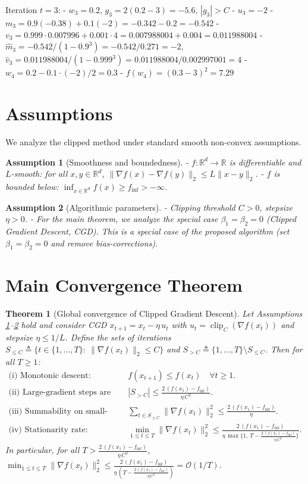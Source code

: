 \documentclass[11pt]{article}
\newtheorem{theorem}{Theorem}
\newtheorem{assumption}{Assumption}
\newcommand{\R}{\mathbb{R}}
\begin{document}
Iteration $t=3$:
- $w_3=0.2$, $g_3 = 2(0.2-3)=-5.6$, $|g_3|>C$
- $u_3=-2$
- $m_3=0.9(-0.38)+0.1(-2)=-0.342-0.2=-0.542$
- $v_3=0.999\cdot 0.007996+0.001\cdot 4=0.007988004+0.004=0.011988004$
- $\hat{m}_3=-0.542/(1-0.9^3)=-0.542/0.271=-2$, $\hat{v}_3=0.011988004/(1-0.999^3)=0.011988004/0.002997001=4$
- $w_4 = 0.2 - 0.1\cdot (-2)/2 = 0.3$
- $f(w_4)=(0.3-3)^2=7.29$

\section*{Assumptions}
We analyze the clipped method under standard smooth non-convex assumptions.

\begin{assumption}[Smoothness and boundedness]
\label{ass:smooth}
- $f:\R^d\to\R$ is differentiable and $L$-smooth: for all $x,y\in\R^d$,
$\|\nabla f(x)-\nabla f(y)\|_2 \le L \|x-y\|_2$.
- $f$ is bounded below: $\inf_{x\in\R^d} f(x) \ge f_\inf > -\infty$.
\end{assumption}

\begin{assumption}[Algorithmic parameters]
\label{ass:params}
- Clipping threshold $C>0$, stepsize $\eta>0$.
- For the main theorem, we analyze the special case $\beta_1=\beta_2=0$ (Clipped Gradient Descent, CGD). This is a special case of the proposed algorithm (set $\beta_1=\beta_2=0$ and remove bias-corrections).
\end{assumption}

\section*{Main Convergence Theorem}
\begin{theorem}[Global convergence of Clipped Gradient Descent]
\label{thm:main}
Let Assumptions \ref{ass:smooth}--\ref{ass:params} hold and consider CGD
$x_{t+1} = x_t - \eta \, u_t$ with $u_t=\operatorname{clip}_C(\nabla f(x_t))$ and stepsize $\eta \le 1/L$.
Define the sets of iterations
$S_{\le C} \triangleq \{t\in\{1,\dots,T\}:\ \|\nabla f(x_t)\|_2 \le C\}$ and $S_{>C} \triangleq \{1,\dots,T\}\setminus S_{\le C}$.
Then for all $T\ge 1$:
\begin{align}
\text{(i) Monotonic descent: } \quad & f(x_{t+1}) \le f(x_t) \quad \forall t\ge 1. \label{eq:thm-descent}\\
\text{(ii) Large-gradient steps are finite: } \quad & |S_{>C}| \le \frac{2\,(f(x_1)-f_\inf)}{\eta\, C^2}. \label{eq:thm-large}\\
\text{(iii) Summability on small-gradient steps: } \quad &
\sum_{t\in S_{\le C}} \|\nabla f(x_t)\|_2^2 \le \frac{2\,(f(x_1)-f_\inf)}{\eta}. \label{eq:thm-small-sum}\\
\text{(iv) Stationarity rate: } \quad &
\min_{1\le t\le T} \|\nabla f(x_t)\|_2^2 \le \frac{2\,(f(x_1)-f_\inf)}{\eta\,\max\{1,\ T - \frac{2\,(f(x_1)-f_\inf)}{\eta\, C^2}\}}. \label{eq:thm-rate}
\end{align}
In particular, for all $T > \frac{2\,(f(x_1)-f_\inf)}{\eta\, C^2}$,
$\min_{1\le t\le T} \|\nabla f(x_t)\|_2^2 \le \frac{2\,(f(x_1)-f_\inf)}{\eta\, (T - \frac{2\,(f(x_1)-f_\inf)}{\eta\, C^2})} = \mathcal{O}(1/T)$.
\end{theorem}
\end{document}
